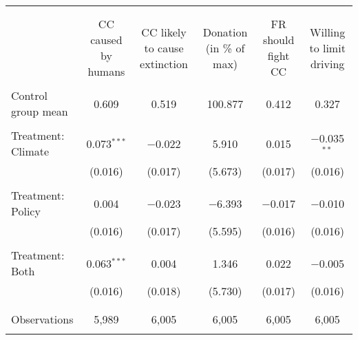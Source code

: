 
\begin{tabular}{@{\extracolsep{5pt}}lccccc} 
\\[-1.8ex]\hline 
\hline \\[-1.8ex] 
\\[-1.8ex] & CC caused by humans & CC likely to cause extinction & Donation (in \% of max) & FR should fight CC & Willing to limit driving \\ 
\hline \\[-1.8ex] 
 Control group mean & 0.609 & 0.519 & 100.877 & 0.412 & 0.327  \\ \hline \\[-1.8ex] Treatment: Climate & 0.073$^{***}$ & $-$0.022 & 5.910 & 0.015 & $-$0.035$^{**}$ \\ 
  & (0.016) & (0.017) & (5.673) & (0.017) & (0.016) \\ 
  & & & & & \\ 
 Treatment: Policy & 0.004 & $-$0.023 & $-$6.393 & $-$0.017 & $-$0.010 \\ 
  & (0.016) & (0.017) & (5.595) & (0.016) & (0.016) \\ 
  & & & & & \\ 
 Treatment: Both & 0.063$^{***}$ & 0.004 & 1.346 & 0.022 & $-$0.005 \\ 
  & (0.016) & (0.018) & (5.730) & (0.017) & (0.016) \\ 
  & & & & & \\ 
\hline \\[-1.8ex] 

Observations & 5,989 & 6,005 & 6,005 & 6,005 & 6,005 \\ 
\hline 
\hline \\[-1.8ex] 
\end{tabular} 